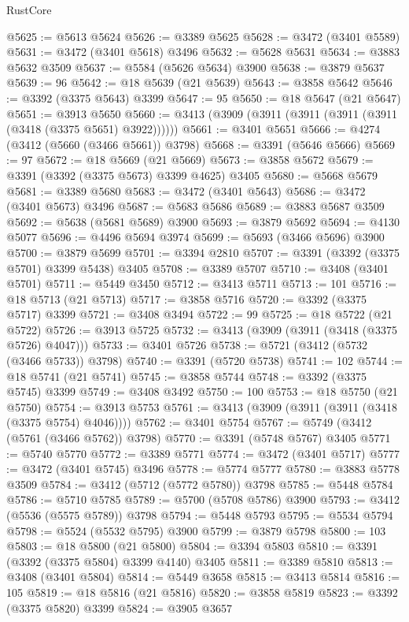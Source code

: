\begin{lexlean}{RustCore}
\begin{coremodule}
@5625 := @5613 @5624
@5626 := @3389 @5625
@5628 := @3472 (@3401 @5589)
@5631 := @3472 (@3401 @5618) @3496
@5632 := @5628 @5631
@5634 := @3883 @5632 @3509
@5637 := @5584 (@5626 @5634) @3900
@5638 := @3879 @5637
@5639 := 96
@5642 := @18 @5639 (@21 @5639)
@5643 := @3858 @5642
@5646 := @3392 (@3375 @5643) @3399
@5647 := 95
@5650 := @18 @5647 (@21 @5647)
@5651 := @3913 @5650
@5660 := @3413 (@3909 (@3911 (@3911 (@3911 (@3911 (@3418 (@3375 @5651) @3922))))))
@5661 := @3401 @5651
@5666 := @4274 (@3412 (@5660 (@3466 @5661)) @3798)
@5668 := @3391 (@5646 @5666)
@5669 := 97
@5672 := @18 @5669 (@21 @5669)
@5673 := @3858 @5672
@5679 := @3391 (@3392 (@3375 @5673) @3399 @4625) @3405
@5680 := @5668 @5679
@5681 := @3389 @5680
@5683 := @3472 (@3401 @5643)
@5686 := @3472 (@3401 @5673) @3496
@5687 := @5683 @5686
@5689 := @3883 @5687 @3509
@5692 := @5638 (@5681 @5689) @3900
@5693 := @3879 @5692
@5694 := @4130 @5077
@5696 := @4496 @5694 @3974
@5699 := @5693 (@3466 @5696) @3900
@5700 := @3879 @5699
@5701 := @3394 @2810
@5707 := @3391 (@3392 (@3375 @5701) @3399 @5438) @3405
@5708 := @3389 @5707
@5710 := @3408 (@3401 @5701)
@5711 := @5449 @3450
@5712 := @3413 @5711
@5713 := 101
@5716 := @18 @5713 (@21 @5713)
@5717 := @3858 @5716
@5720 := @3392 (@3375 @5717) @3399
@5721 := @3408 @3494
@5722 := 99
@5725 := @18 @5722 (@21 @5722)
@5726 := @3913 @5725
@5732 := @3413 (@3909 (@3911 (@3418 (@3375 @5726) @4047)))
@5733 := @3401 @5726
@5738 := @5721 (@3412 (@5732 (@3466 @5733)) @3798)
@5740 := @3391 (@5720 @5738)
@5741 := 102
@5744 := @18 @5741 (@21 @5741)
@5745 := @3858 @5744
@5748 := @3392 (@3375 @5745) @3399
@5749 := @3408 @3492
@5750 := 100
@5753 := @18 @5750 (@21 @5750)
@5754 := @3913 @5753
@5761 := @3413 (@3909 (@3911 (@3911 (@3418 (@3375 @5754) @4046))))
@5762 := @3401 @5754
@5767 := @5749 (@3412 (@5761 (@3466 @5762)) @3798)
@5770 := @3391 (@5748 @5767) @3405
@5771 := @5740 @5770
@5772 := @3389 @5771
@5774 := @3472 (@3401 @5717)
@5777 := @3472 (@3401 @5745) @3496
@5778 := @5774 @5777
@5780 := @3883 @5778 @3509
@5784 := @3412 (@5712 (@5772 @5780)) @3798
@5785 := @5448 @5784
@5786 := @5710 @5785
@5789 := @5700 (@5708 @5786) @3900
@5793 := @3412 (@5536 (@5575 @5789)) @3798
@5794 := @5448 @5793
@5795 := @5534 @5794
@5798 := @5524 (@5532 @5795) @3900
@5799 := @3879 @5798
@5800 := 103
@5803 := @18 @5800 (@21 @5800)
@5804 := @3394 @5803
@5810 := @3391 (@3392 (@3375 @5804) @3399 @4140) @3405
@5811 := @3389 @5810
@5813 := @3408 (@3401 @5804)
@5814 := @5449 @3658
@5815 := @3413 @5814
@5816 := 105
@5819 := @18 @5816 (@21 @5816)
@5820 := @3858 @5819
@5823 := @3392 (@3375 @5820) @3399
@5824 := @3905 @3657

\end{coremodule}
\end{lexlean}
